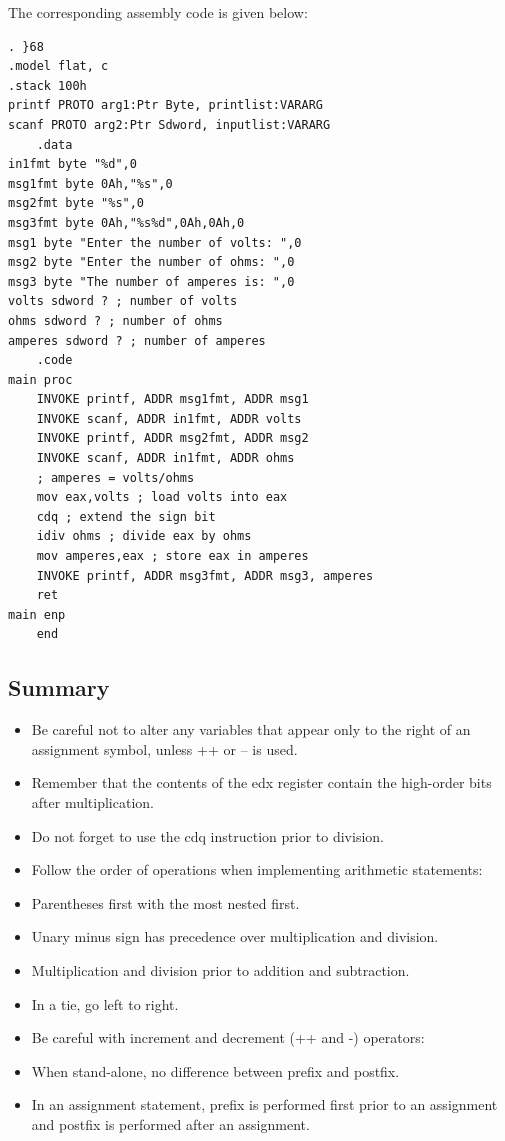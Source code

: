 \documentclass[10pt]{book}
\begin{document}
The corresponding assembly code is given below:

\begin{verbatim}
. }68
.model flat, c
.stack 100h
printf PROTO arg1:Ptr Byte, printlist:VARARG
scanf PROTO arg2:Ptr Sdword, inputlist:VARARG
    .data
in1fmt byte "%d",0
msg1fmt byte 0Ah,"%s",0
msg2fmt byte "%s",0
msg3fmt byte 0Ah,"%s%d",0Ah,0Ah,0
msg1 byte "Enter the number of volts: ",0
msg2 byte "Enter the number of ohms: ",0
msg3 byte "The number of amperes is: ",0
volts sdword ? ; number of volts
ohms sdword ? ; number of ohms
amperes sdword ? ; number of amperes
    .code
main proc
    INVOKE printf, ADDR msg1fmt, ADDR msg1
    INVOKE scanf, ADDR in1fmt, ADDR volts
    INVOKE printf, ADDR msg2fmt, ADDR msg2
    INVOKE scanf, ADDR in1fmt, ADDR ohms
    ; amperes = volts/ohms
    mov eax,volts ; load volts into eax
    cdq ; extend the sign bit
    idiv ohms ; divide eax by ohms
    mov amperes,eax ; store eax in amperes
    INVOKE printf, ADDR msg3fmt, ADDR msg3, amperes
    ret
main enp
    end
\end{verbatim}

\subsection{Summary}
\begin{itemize}
  \item Be careful not to alter any variables that appear only to the right of an assignment symbol, unless ++ or -- is used.
  \item Remember that the contents of the edx register contain the high-order bits after multiplication.
  \item Do not forget to use the cdq instruction prior to division.
  \item Follow the order of operations when implementing arithmetic statements:
  \item Parentheses first with the most nested first.
  \item Unary minus sign has precedence over multiplication and division.
  \item Multiplication and division prior to addition and subtraction.
  \item In a tie, go left to right.
  \item Be careful with increment and decrement (++ and -) operators:
  \item When stand-alone, no difference between prefix and postfix.
  \item In an assignment statement, prefix is performed first prior to an assignment and postfix is performed after an assignment.
\end{itemize}
\end{document}
